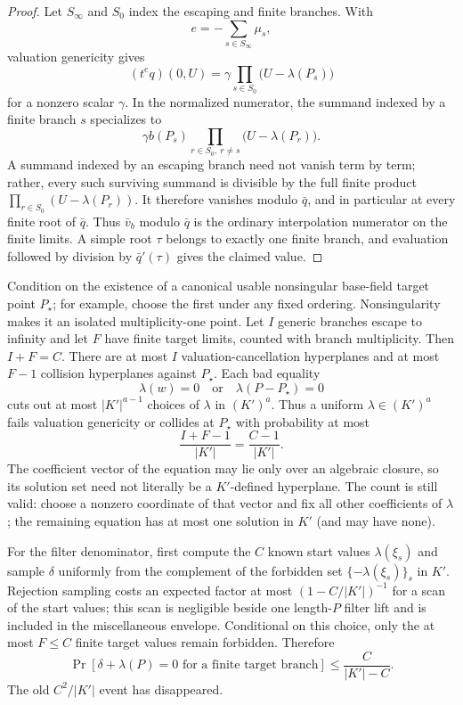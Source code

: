 \documentclass[11pt,a4paper]{article}
\theoremstyle{definition}
\theoremstyle{remark}
\begin{document}
\begin{proof}
Let $S_\infty$ and $S_0$ index the escaping and finite branches.  With
\[
 e=-\sum_{s\in S_\infty}\mu_s,
\]
valuation genericity gives
\[
 (t^e q)(0,U)=\gamma\prod_{s\in S_0}
   \bigl(U-\lambda(P_s)\bigr)
\]
for a nonzero scalar $\gamma$.  In the normalized numerator, the summand indexed by a finite branch $s$ specializes to
\[
 \gamma b(P_s)\prod_{r\in S_0,\ r\ne s}
   \bigl(U-\lambda(P_r)\bigr).
\]
A summand indexed by an escaping branch need not vanish term by term; rather, every such surviving summand is divisible by the full finite product $\prod_{r\in S_0}(U-\lambda(P_r))$.  It therefore vanishes modulo $\bar q$, and in particular at every finite root of $\bar q$.  Thus $\bar v_b$ modulo $\bar q$ is the ordinary interpolation numerator on the finite limits.  A simple root $\tau$ belongs to exactly one finite branch, and evaluation followed by division by $\bar q'(\tau)$ gives the claimed value.
\end{proof}

Condition on the existence of a canonical usable nonsingular base-field target point $P_\star$; for example, choose the first under any fixed ordering.  Nonsingularity makes it an isolated multiplicity-one point.  Let $I$ generic branches escape to infinity and let $F$ have finite target limits, counted with branch multiplicity.  Then $I+F=C$.  There are at most $I$ valuation-cancellation hyperplanes and at most $F-1$ collision hyperplanes against $P_\star$.  Each bad equality
\[
 \lambda(w)=0
 \quad\text{or}\quad
 \lambda(P-P_\star)=0
\]
cuts out at most $|K'|^{a-1}$ choices of $\lambda$ in $(K')^a$.  Thus a uniform $\lambda\in(K')^a$ fails valuation genericity or collides at $P_\star$ with probability at most
\begin{equation}\label{supp:eq:lambdafail}
 \frac{I+F-1}{|K'|}=\frac{C-1}{|K'|}.
\end{equation}
The coefficient vector of the equation may lie only over an algebraic closure, so its solution set need not literally be a $K'$-defined hyperplane.  The count is still valid: choose a nonzero coordinate of that vector and fix all other coefficients of $\lambda$; the remaining equation has at most one solution in $K'$ (and may have none).

For the filter denominator, first compute the $C$ known start values $\lambda(\xi_s)$ and sample $\delta$ uniformly from the complement of the forbidden set $\{-\lambda(\xi_s)\}_s$ in $K'$.  Rejection sampling costs an expected factor at most $(1-C/|K'|)^{-1}$ for a scan of the start values; this scan is negligible beside one length-$P$ filter lift and is included in the miscellaneous envelope.  Conditional on this choice, only the at most $F\le C$ finite target values remain forbidden.  Therefore
\begin{equation}\label{supp:eq:cfail}
 \Pr[\delta+\lambda(P)=0\text{ for a finite target branch}]
 \le \frac{C}{|K'|-C}.
\end{equation}
The old $C^2/|K'|$ event has disappeared.
\end{document}
